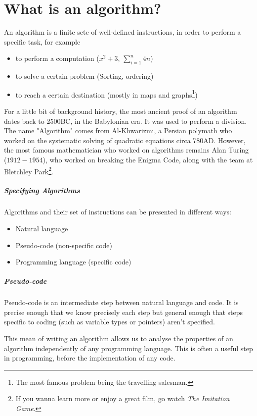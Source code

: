 \documentclass[10pt,a4paper]{book}
\begin{document}
\chapter{What is an algorithm?}
An algorithm is a finite sete of well-defined instructions, in order to perform a specific task, for example
\begin{itemize}
\item to perform a computation ($x^2 + 3$, $\sum_{i=1}^{n} 4n$)
\item to solve a certain problem (Sorting, ordering)
\item to reach a certain destination (mostly in maps and graphs\footnote{The most famous problem being the travelling salesman.})
\end{itemize}
For a little bit of background history, the most ancient proof of an algorithm dates back to 2500BC, in the Babylonian era. It was used to perform a division. The name "Algorithm" comes from Al-Khwārizmī, a Persian polymath who worked on the systematic solving of quadratic equations circa 780AD. However, the most famous mathematician who worked on algorithms remains Alan Turing ($1912-1954$), who worked on breaking the Enigma Code, along with the team at Bletchley Park\footnote{If you wanna learn more or enjoy a great film, go watch \textit{The Imitation Game}.}.
\paragraph*{Specifying Algorithms}
Algorithms and their set of instructions can be presented in different ways:
\begin{itemize}
\item Natural language
\item Pseudo-code (non-specific code)
\item Programming language (specific code)
\end{itemize}
\paragraph*{Pseudo-code}
Pseudo-code is an intermediate step between natural language and code. It is precise enough that we know precisely each step but general enough that steps specific to coding (such as variable types or pointers) aren't specified.\par
This mean of writing an algorithm allows us to analyse the properties of an algorithm independently of any programming language. This is often a useful step in programming, before the implementation of any code.
\end{document}

